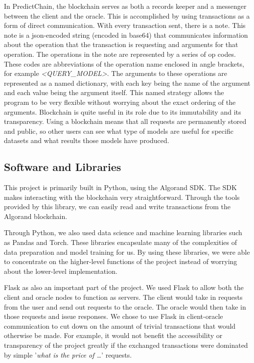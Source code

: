 \documentclass{article}
\begin{document}
    In PredictChain, the blockchain serves as both a records keeper and a messenger between the client and the oracle.
    This is accomplished by using transactions as a form of direct communication.  With every transaction sent, there is a note.
    This note is a json-encoded string (encoded in base64) that communicates information about the operation that the transaction
    is requesting and arguments for that operation.  The operations in the note are represented by a series
    of op codes.  These codes are abbreviations of the operation name enclosed in angle brackets, for example \textit{<QUERY\_MODEL>}.
    The arguments to these operations are represented as a named dictionary, with each key being the name of the argument and each
    value being the argument itself.  This named strategy allows the program to be very flexible without worrying about the exact
    ordering of the arguments.  Blockchain is quite useful in its role due to its immutability and its transparency.  Using
    a blockchain means that all requests are permanently stored and public, so other users can see what type of models are useful
    for specific datasets and what results those models have produced.

    \subsection{Software and Libraries}

    This project is primarily built in Python, using the Algorand SDK.  The SDK makes interacting with the blockchain
    very straightforward.  Through the tools provided by this library, we can easily read and write transactions from
    the Algorand blockchain.

    Through Python, we also used data science and machine learning libraries such as Pandas
    and Torch.  These libraries encapsulate many of the complexities of data preparation and model training for us.
    By using these libraries, we were able to concentrate on the higher-level functions of the project instead of worrying
    about the lower-level implementation.

    Flask as also an important part of the project.  We used Flask to allow both
    the client and oracle nodes to function as servers.  The client would take in requests from the user and send out
    requests to the oracle.  The oracle would then take in those requests and issue responses.  We chose to use Flask in
    client-oracle communication to cut down on the amount of trivial transactions that would otherwise be made.  For example,
    it would not benefit the accessibility or transparency of the project greatly if the exchanged transactions were
    dominated by simple '\textit{what is the price of \ldots}' requests.
\end{document}
